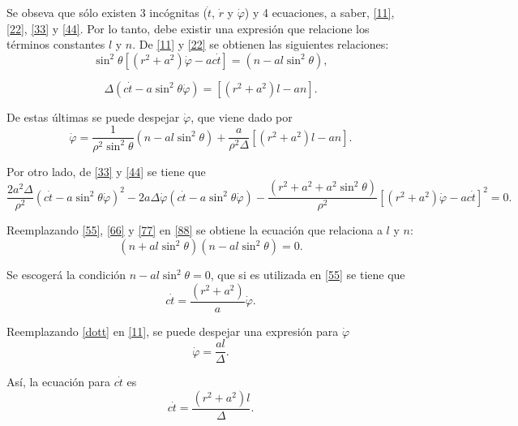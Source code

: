 Se obseva que sólo existen 3 incógnitas ($\dot{t}$, $\dot{r}$ y $\dot{\varphi}$) y 4 ecuaciones, a saber, \eqref{11}, \eqref{22}, \eqref{33} y \eqref{44}. Por lo tanto, debe existir una expresión que relacione los términos constantes $l$ y $n$. De \eqref{11} y \eqref{22} se obtienen las siguientes relaciones:
\begin{equation}\label{55}
\sin^2\theta \left[(r^2+a^2)\dot{\varphi}-ac\dot{t} \right]=(n-al\sin^2\theta),
\end{equation}
 
\begin{equation}\label{66}
\Delta(c\dot{t}-a\sin^2\theta\dot{\varphi})=\left[(r^2+a^2)l-an\right].
\end{equation}
 
De estas últimas se puede despejar $\dot{\varphi}$, que viene dado por
\begin{equation}\label{77}
\dot{\varphi}=\frac{1}{\rho^2\sin^2\theta}(n-al\sin^2\theta)+\frac{a}{\rho^2\Delta}\left[(r^2+a^2)l-an\right].
\end{equation}
 
 Por otro lado, de \eqref{33} y \eqref{44} se tiene que
\begin{equation}\label{88}
 \frac{2a^2\Delta}{\rho^2}(c\dot{t}-a\sin^2\theta\dot{\varphi})^2 
 -2a\Delta \dot{\varphi}(c\dot{t}-a\sin^2\theta\dot{\varphi})-\frac{(r^2+a^2+a^2\sin^2\theta)}{\rho^2}\left[(r^2+a^2)\dot{\varphi}-ac\dot{t}\right]^2=0.
\end{equation}
 
 Reemplazando \eqref{55}, \eqref{66} y \eqref{77} en \eqref{88} se obtiene la ecuación que relaciona a $l$ y $n$:
 \begin{equation}
 (n+al\sin^2 \theta)(n-al\sin^2 \theta)=0.
 \end{equation}
 
Se escogerá la condición $n-al\sin^2\theta=0$, que si es utilizada en \eqref{55} se tiene que
\begin{equation}\label{dott}
c\dot{t}=\frac{(r^2+a^2)}{a}\dot{\varphi}.
\end{equation}

Reemplazando \eqref{dott} en \eqref{11}, se puede despejar una expresión para $\dot{\varphi}$
\begin{equation}\label{dotvar}
\dot{\varphi}=\frac{al}{\Delta}.
\end{equation}

Así, la ecuación para $c\dot{t}$ es
\begin{equation}\label{dott2}
c\dot{t}=\frac{(r^2+a^2)l}{\Delta}.
\end{equation}

